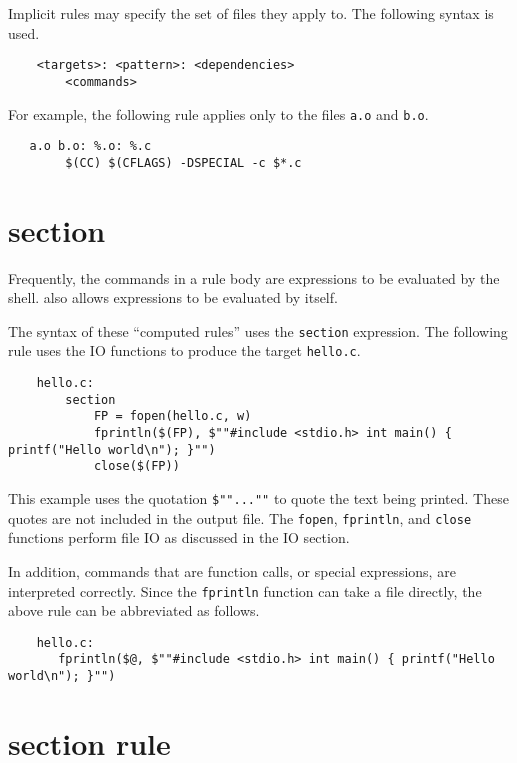 Implicit rules may specify the set of files they apply to.  The following syntax is used.

\begin{verbatim}
    <targets>: <pattern>: <dependencies>
        <commands>
\end{verbatim}

For example, the following rule applies only to the files \verb+a.o+ and \verb+b.o+.

\begin{verbatim}
   a.o b.o: %.o: %.c
        $(CC) $(CFLAGS) -DSPECIAL -c $*.c
\end{verbatim}

\section{section}

Frequently, the commands in a rule body are expressions to be evaluated by the shell.  
also allows expressions to be evaluated by  itself.

The syntax of these ``computed rules'' uses the \verb+section+ expression.  The following rule uses
the  IO functions to produce the target \verb+hello.c+.

\begin{verbatim}
    hello.c:
        section
            FP = fopen(hello.c, w)
            fprintln($(FP), $""#include <stdio.h> int main() { printf("Hello world\n"); }"")
            close($(FP))
\end{verbatim}

This example uses the quotation \verb+$""...""+ to quote the text being printed.  These quotes are
not included in the output file.  The \verb+fopen+, \verb+fprintln+, and \verb+close+ functions
perform file IO as discussed in the IO section.

In addition, commands that are function calls, or special expressions, are interpreted correctly.
Since the \verb+fprintln+ function can take a file directly, the above rule can be abbreviated as
follows.

\begin{verbatim}
    hello.c:
       fprintln($@, $""#include <stdio.h> int main() { printf("Hello world\n"); }"")
\end{verbatim}

\section{section rule}

